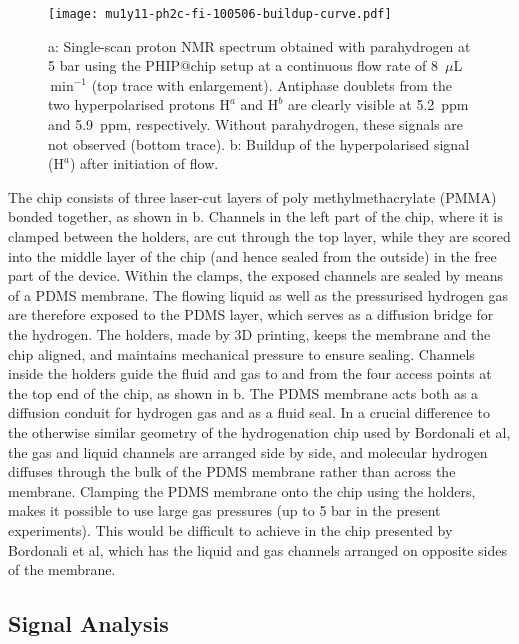\begin{figure}
	\centering
	\texttt{[image: mu1y11-ph2c-fi-100506-buildup-curve.pdf]}
	\caption{a: Single-scan proton NMR spectrum obtained with
  parahydrogen at 5 bar using the PHIP@chip setup at a continuous
  flow rate of 8~$\mu$L$\,\text{min}^{-1}$ (top trace with enlargement).
  Antiphase doublets from the two
	hyperpolarised protons $\mathrm{H}^a$  and $\mathrm{H}^{b}$ are
  clearly visible at 5.2~ppm and 5.9~ppm, respectively. Without
  parahydrogen, these signals are not observed (bottom trace).
	b: Buildup of the hyperpolarised signal ($\mathrm{H}^{a}$)
  after initiation of flow.
	}
	\label{fig:phip@chip2}
\end{figure}


The chip consists of three laser-cut layers of poly methylmethacrylate (PMMA)
bonded together, as shown in b. Channels in the
left part of the chip, where it is clamped between the holders, are cut through
the top layer, while they are scored into the middle layer of the chip (and
hence sealed from the outside) in the free part of the device.
Within the clamps, the exposed channels are sealed by means of a PDMS membrane.
The flowing liquid as well as
the pressurised hydrogen gas are therefore exposed to the PDMS layer,
which serves as a diffusion bridge for the hydrogen.
The holders, made by 3D printing, keeps the membrane and the chip aligned,
and maintains mechanical pressure to ensure sealing. Channels
inside the holders guide the fluid and gas to and from
the four access points at the top end
of the chip, as shown in b.
The PDMS membrane acts both as a diffusion conduit for hydrogen gas
and as a fluid seal.
In a crucial difference to the otherwise similar geometry of the
hydrogenation chip used by Bordonali et al\cite{Bordonali:2019jq},
the gas and liquid channels are arranged side by side, and molecular
hydrogen diffuses through the bulk of the PDMS membrane rather than across the membrane. Clamping the PDMS membrane onto the chip using the
holders, makes it possible to use large gas pressures (up to 5 bar in
the present experiments). This would be difficult to achieve in the
chip presented by Bordonali et al, which has the liquid and gas channels
arranged on opposite sides of the membrane.

\subsection{Signal Analysis}

